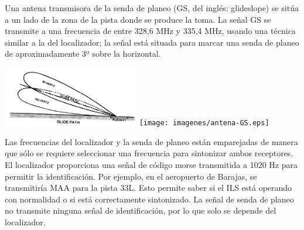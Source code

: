 \documentclass[10pt]{beamer}
\begin{document}
\begin{frame}
  Una antena transmisora de la senda de planeo (GS, del inglés: glideslope) se sitúa a un lado de la zona de la pista donde se produce la toma. La señal GS se transmite a una frecuencia de entre 328,6 MHz y 335,4 MHz, usando una técnica similar a la del localizador; la señal está situada para marcar una senda de planeo de aproximadamente 3º sobre la horizontal.

\begin{center}
  \includegraphics[height=2.6cm]{imagenes/glidepath.jpg} \hspace{3mm}
  \texttt{[image: imagenes/antena-GS.eps]}
\end{center}

\end{frame}

\begin{frame}
  Las frecuencias del localizador y la senda de planeo están emparejadas de manera que sólo se requiere seleccionar una frecuencia para sintonizar ambos receptores. El localizador proporciona una señal de código morse transmitida a 1020 Hz para permitir la identificación. Por ejemplo, en el aeropuerto de Barajas, se transmitiría MAA para la pista 33L. Esto permite saber si el ILS está operando con normalidad o si está correctamente sintonizado. La señal de senda de planeo no transmite ninguna señal de identificación, por lo que solo se depende del localizador.


\end{frame}
\end{document}
